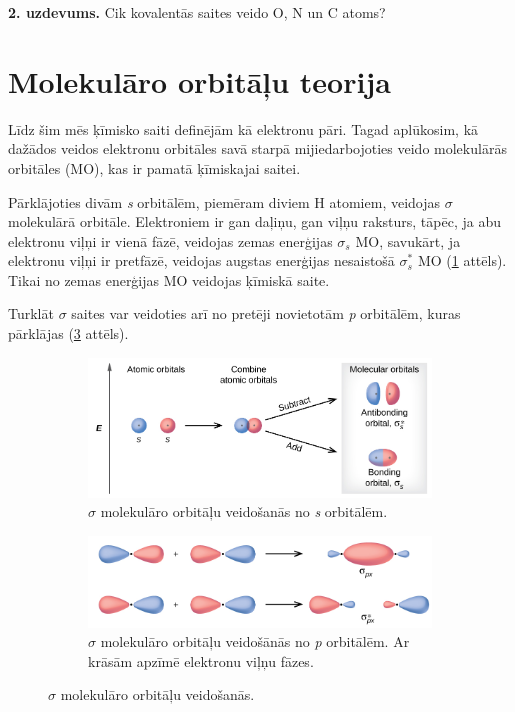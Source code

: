 \documentclass[12pt,a4paper]{article}
\newcommand{\figref}[1]{\ref{#1} attēls}
\newenvironment{taskbox}
{\begin{framed}\begin{minipage}{\textwidth}}
{\end{minipage}\end{framed}}
\begin{document}
\begin{taskbox}
\textbf{2. uzdevums.}
Cik kovalentās saites veido O, N un C atoms?
\end{taskbox}

\section{Molekulāro orbitāļu teorija}

Līdz šim mēs ķīmisko saiti definējām kā elektronu pāri. Tagad aplūkosim, kā dažādos veidos elektronu orbitāles savā starpā mijiedarbojoties veido molekulārās orbitāles (MO), kas ir pamatā ķīmiskajai saitei.

Pārklājoties divām \textit{s} orbitālēm, piemēram diviem H atomiem, veidojas $\sigma$ molekulārā orbitāle. Elektroniem ir gan daļiņu, gan viļņu raksturs, tāpēc, ja abu elektronu viļņi ir vienā fāzē, veidojas zemas enerģijas $\sigma_s$ MO, savukārt, ja elektronu viļņi ir pretfāzē, veidojas augstas enerģijas nesaistošā $\sigma_s^*$ MO (\figref{fig:sigma}). Tikai no zemas enerģijas MO veidojas ķīmiskā saite.

Turklāt $\sigma$ saites var veidoties arī no pretēji novietotām \textit{p} orbitālēm, kuras pārklājas (\figref{fig:p_sigma}).

\begin{figure}[H]
    \centering
    \begin{subfigure}[b]{0.45\textwidth}
        \centering
        \includegraphics[width=\textwidth]{atteli/sigma.jpg}
        \caption{$\sigma$ molekulāro orbitāļu veidošanās no \textit{s} orbitālēm.}
        \label{fig:sigma}
    \end{subfigure}
    \hfill
    \begin{subfigure}[b]{0.45\textwidth}
        \centering
        \includegraphics[width=\textwidth]{atteli/p_sigma.jpg}
        \caption{$\sigma$ molekulāro orbitāļu veidošānās no \textit{p} orbitālēm. Ar krāsām apzīmē elektronu viļņu fāzes.}
        \label{fig:p_sigma}
    \end{subfigure}
    \caption{$\sigma$ molekulāro orbitāļu veidošanās.}
\end{figure}
\end{document}

